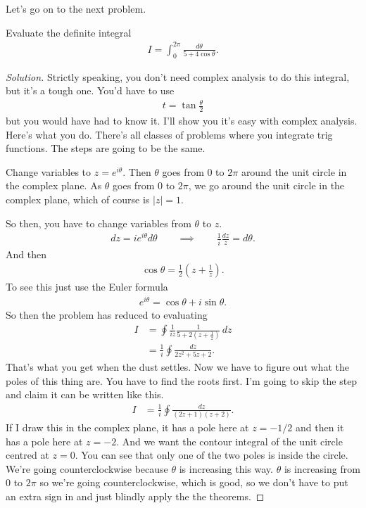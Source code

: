 Let's go on to the next problem.
\begin{example}
    Evaluate the definite integral
    \begin{align}
        I = \int_{0}^{2\pi} \frac{d\theta}{5 + 4\cos\theta}.
    \end{align}
\end{example}
\begin{proof}[Solution]
    Strictly speaking,
    you don't need complex analysis to do this integral,
    but it's a tough one.
    You'd have to use
    \begin{align}
        t = \tan\frac{\theta}{2}
    \end{align}
    but you would have had to know it.
    I'll show you it's easy with complex analysis.
    Here's what you do.
    There's all classes of problems where you integrate trig functions.
    The steps are going to be the same.

    Change variables to $z=e^{i\theta}$.
    Then $\theta$ goes from $0$ to $2\pi$
    around the unit circle in the complex plane.
    As $\theta$ goes from $0$ to $2\pi$,
    we go around the unit circle in the complex plane,
    which of course is $|z|=1$.

    So then, you have to change variables from $\theta$ to $z$.
    \begin{align}
        dz = i e^{i\theta} d\theta\qquad
        \implies\qquad
        \frac{1}{i} \frac{dz}{z} = d\theta.
    \end{align}
    And then
    \begin{align}
        \cos\theta = \frac{1}{2}\left(
            z + \frac{1}{z}
        \right).
    \end{align}
    To see this
    just use the Euler formula
    \begin{align}
        e^{i\theta} = \cos\theta + i\sin\theta.
    \end{align}
    So then the problem has reduced to evaluating
    \begin{align}
        I &=
        \oint \frac{1}{iz}
        \frac{1}{5 + 2\left( z + \frac{1}{z} \right)}\,dz\\
        &= \frac{1}{i}\oint \frac{dz}{2z^2 + 5z + 2}.
    \end{align}
    That's what you get when the dust settles.
    Now we have to figure out what the poles of this thing are.
    You have to find the roots first.
    I'm going to skip the step and claim it can be written like this.
    \begin{align}
        I &=
        \frac{1}{i}
        \oint
        \frac{dz}{(2z + 1)(z + 2)}.
    \end{align}
    If I draw this in the complex plane,
    it has a pole here at $z=-1/2$ and then it has a pole here at $z=-2$.
    And we want the contour integral of the unit circle
    centred at $z=0$.
    You can see that only one of the two poles is inside the circle.
    We're going counterclockwise because $\theta$ is increasing this way.
    $\theta$ is increasing from $0$ to $2\pi$ so we're going counterclockwise,
    which is good,
    so we don't have to put an extra sign in
    and just blindly apply the the theorems.


\end{proof}
